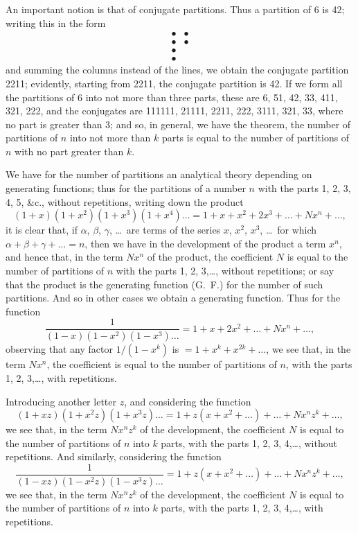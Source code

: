 \documentclass[11pt,a4paper]{article}
\begin{document}
An important notion is that of conjugate partitions. Thus a partition of 6 is 42; writing this in the form
\[
\begin{array}{cc}
\bullet & \bullet \\
\bullet & \bullet \\
\bullet & \\
\bullet &
\end{array}
\]
and summing the columns instead of the lines, we obtain the conjugate partition 2211; evidently, starting from 2211, the conjugate partition is 42. If we form all the partitions of 6 into not more than three parts, these are 6, 51, 42, 33, 411, 321, 222, and the conjugates are 111111, 21111, 2211, 222, 3111, 321, 33, where no part is greater than 3; and so, in general, we have the theorem, the number of partitions of $n$ into not more than $k$ parts is equal to the number of partitions of $n$ with no part greater than $k$.

We have for the number of partitions an analytical theory depending on generating functions; thus for the partitions of a number $n$ with the parts 1, 2, 3, 4, 5, \&c., without repetitions, writing down the product
\[
(1 + x)(1 + x^{2})(1 + x^{3})(1 + x^{4})\ldots = 1 + x + x^{2} + 2x^{3} + \ldots + Nx^{n} + \ldots,
\]
it is clear that, if $\alpha$, $\beta$, $\gamma$, \ldots\ are terms of the series $x$, $x^{2}$, $x^{3}$, \ldots\ for which $\alpha + \beta + \gamma + \ldots = n$, then we have in the development of the product a term $x^{n}$, and hence that, in the term $Nx^{n}$ of the product, the coefficient $N$ is equal to the number of partitions of $n$ with the parts 1, 2, 3,\ldots, without repetitions; or say that the product is the generating function (G.\ F.) for the number of such partitions. And so in other cases we obtain a generating function. Thus for the function
\[
\frac{1}{(1 - x)(1 - x^{2})(1 - x^{3})\ldots} = 1 + x + 2x^{2} + \ldots + Nx^{n} + \ldots,
\]
observing that any factor $1/(1 - x^{k})$ is $= 1 + x^{k} + x^{2k} + \ldots$, we see that, in the term $Nx^{n}$, the coefficient is equal to the number of partitions of $n$, with the parts 1, 2, 3,\ldots, with repetitions.

Introducing another letter $z$, and considering the function
\[
(1 + xz)(1 + x^{2}z)(1 + x^{3}z)\ldots = 1 + z(x + x^{2} + \ldots) + \ldots + Nx^{n}z^{k} + \ldots,
\]
we see that, in the term $Nx^{n}z^{k}$ of the development, the coefficient $N$ is equal to the number of partitions of $n$ into $k$ parts, with the parts 1, 2, 3, 4,\ldots, without repetitions. And similarly, considering the function
\[
\frac{1}{(1 - xz)(1 - x^{2}z)(1 - x^{3}z)\ldots} = 1 + z(x + x^{2} + \ldots) + \ldots + Nx^{n}z^{k} + \ldots,
\]
we see that, in the term $Nx^{n}z^{k}$ of the development, the coefficient $N$ is equal to the number of partitions of $n$ into $k$ parts, with the parts 1, 2, 3, 4,\ldots, with repetitions.
\end{document}
